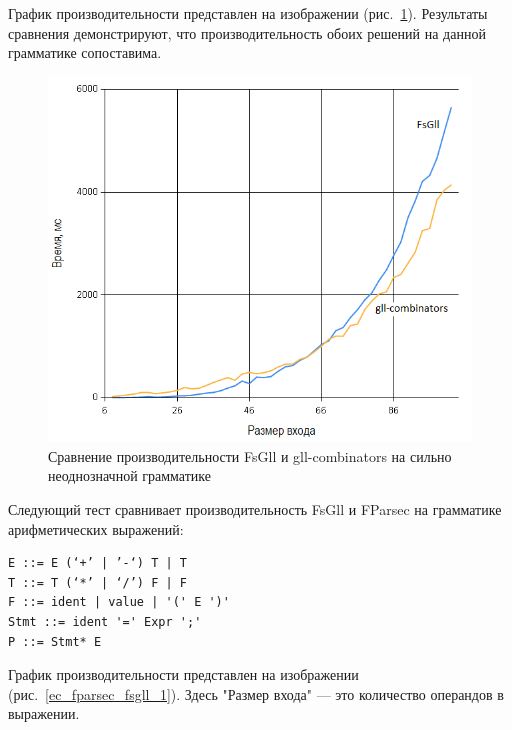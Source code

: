 \documentclass[14pt]{matmex-diploma}
\begin{document}
График производительности представлен на изображении (рис.~\ref{nnn_scala_fsgll}).
Результаты сравнения демонстрируют, что производительность обоих решений на данной грамматике сопоставима. 

\begin{figure}[!h]
  \label{nnn_scala_fsgll}
  \centering
  \includegraphics[width=15cm]{pics/graph1.png}
  \caption{Сравнение производительности FsGll и gll-combinators на сильно неоднозначной грамматике}
\end{figure}
\FloatBarrier



Следующий тест сравнивает производительность FsGll и FParsec на грамматике арифметических выражений:
\begin{lstlisting}
E ::= E (‘+’ | ’-‘) T | T
T ::= T (‘*’ | ‘/’) F | F
F ::= ident | value | '(' E ')'
Stmt ::= ident '=' Expr ';'
P ::= Stmt* E
\end{lstlisting}

График производительности представлен на изображении (рис.~\ref{ec_fparsec_fsgll_1}). 
Здесь "Размер входа" --- это количество операндов в выражении.
\end{document}
